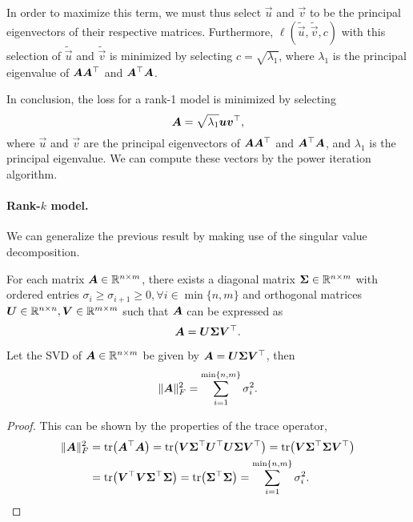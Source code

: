 In order to maximize this term, we must thus select $\vec{u}$ and $\vec{v}$ to be the principal
eigenvectors of their respective matrices. Furthermore, $\ell(\tilde{\vec{u}}, \tilde{\vec{v}}, c)$
with this selection of $\tilde{\vec{u}}$ and $\tilde{\vec{v}}$ is minimized by selecting $c =
    \sqrt{\lambda_1}$, where $\lambda_1$ is the principal eigenvalue of $\bm{A}\bm{A}^\top$
and $\bm{A}^\top \bm{A}$.

In conclusion, the loss for a rank-1 model is minimized by selecting \[
    \bm{A} = \sqrt{\lambda_1} \bm{u} \bm{v}^\top,
\]
where $\vec{u}$ and $\vec{v}$ are the principal eigenvectors of $\bm{A} \bm{A}^\top$ and
$\bm{A}^\top \bm{A}$, and $\lambda_1$ is the principal eigenvalue. We can compute these
vectors by the power iteration algorithm.

\paragraph{Rank-$k$ model.}

We can generalize the previous result by making use of the singular value decomposition.

\begin{theorem}
    For each matrix $\bm{A} \in \mathbb{R}^{n \times m}$, there exists a diagonal matrix $\bm{\Sigma} \in
        \mathbb{R}^{n \times m}$ with ordered entries $\sigma_i \geq \sigma_{i+1} \geq 0, \forall i \in
        \min\{ n,m \}$ and orthogonal matrices $\bm{U} \in \mathbb{R}^{n \times n}, \bm{V} \in \mathbb{R}^{m\times
            m}$ such that $\bm{A}$ can be expressed as \[
        \bm{A} = \bm{U} \bm{\Sigma} \bm{V}^\top.
    \]
\end{theorem}

\begin{lemma}
    \label{lem:svd-frob}
    Let the SVD of $\bm{A} \in \mathbb{R}^{n \times m}$ be given by $\bm{A} = \bm{U} \bm{\Sigma} \bm{V}^\top$, then \[
        \| \bm{A} \|_F^2 = \sum_{i=1}^{\min\{n,m\}} \sigma_i^2.
    \]
\end{lemma}

\begin{proof}
    This can be shown by the properties of the trace operator,
    \begin{align*}
        \| \mat{A} \|_F^2 & = \tr{\transpose{\mat{A}} \mat{A}} = \tr{\mat{V} \transpose{\mat{\Sigma}} \transpose{\mat{U}} \mat{U} \mat{\Sigma} \transpose{\mat{V}}} = \tr{\mat{V} \transpose{\mat{\Sigma}} \mat{\Sigma} \transpose{\mat{V}}} \\
                          & = \tr{\transpose{\mat{V}} \mat{V} \transpose{\mat{\Sigma}} \mat{\Sigma}} = \tr{\transpose{\mat{\Sigma}} \mat{\Sigma}} = \sum_{i=1}^{\min \{ n,m \}} \sigma_i^2.
    \end{align*}
\end{proof}

